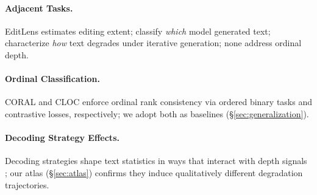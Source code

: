 \paragraph{Adjacent Tasks.}
EditLens \cite{editlens2026} estimates editing extent; \citet{uchendu2020_attribution} classify \emph{which} model generated text; \citet{mohamed2025_broken_telephone} characterize \emph{how} text degrades under iterative generation; none address ordinal depth.

\paragraph{Ordinal Classification.}
CORAL \cite{coral2020} and CLOC \cite{cloc2025} enforce ordinal rank consistency via ordered binary tasks and contrastive losses, respectively; we adopt both as baselines (\S\ref{sec:generalization}).

\paragraph{Decoding Strategy Effects.}
Decoding strategies shape text statistics in ways that interact with depth signals \cite{holtzman2020_nucleus,finlayson2024_closing,garces_arias2025_decoding_decoded,wiher2022_decoding,basu2021_mirostat}; our atlas (\S\ref{sec:atlas}) confirms they induce qualitatively different degradation trajectories.